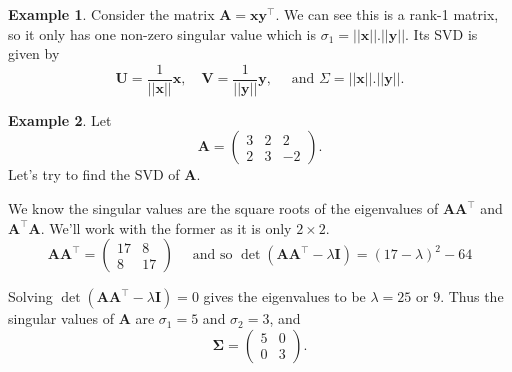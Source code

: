 \documentclass[]{book}
\theoremstyle{definition}
\theoremstyle{definition}
\newtheorem{example}{Example}[chapter]
\theoremstyle{definition}
\theoremstyle{remark}
\begin{document}
\begin{example}
\protect\hypertarget{exm:svd1}{}{\label{exm:svd1} }Consider the matrix \(\boldsymbol A= \boldsymbol x\boldsymbol y^\top\). We can see this is a rank-1 matrix, so it only has one non-zero singular value which is \(\sigma_1 = ||\boldsymbol x||.||\boldsymbol y||\). Its SVD is given by
\[\boldsymbol U= \frac{1}{||\boldsymbol x|| }\boldsymbol x,\quad \boldsymbol V= \frac{1}{||\boldsymbol y|| }\boldsymbol y, \quad \mbox{ and } \Sigma =  ||\boldsymbol x||.||\boldsymbol y||.\]
\end{example}

\begin{example}
\protect\hypertarget{exm:svd2}{}{\label{exm:svd2} }Let
\[\boldsymbol A= \left(\begin{array}{ccc}3&2&2\\
               2&3&-2\end{array}\right).\]
Let's try to find the SVD of \(\boldsymbol A\).

We know the singular values are the square roots of the eigenvalues of \(\boldsymbol A\boldsymbol A^\top\) and \(\boldsymbol A^\top\boldsymbol A\). We'll work with the former as it is only \(2\times 2\).
\[\boldsymbol A\boldsymbol A^\top =  \left(\begin{array}{cc}17&8\\
               8&17\end{array}\right) \quad \mbox{ and so } \det(\boldsymbol A\boldsymbol A^\top-\lambda \mathbf I)=(17-\lambda)^2-64
\]

Solving \(\det(\boldsymbol A\boldsymbol A^\top-\lambda \mathbf I)=0\) gives the eigenvalues to be \(\lambda=25\) or \(9\). Thus the singular values of \(\boldsymbol A\) are \(\sigma_1=5\) and \(\sigma_2=3\), and
\[\boldsymbol \Sigma=\left(\begin{array}{cc}5&0\\
               0&3\end{array}\right).\]


\end{example}
\end{document}
